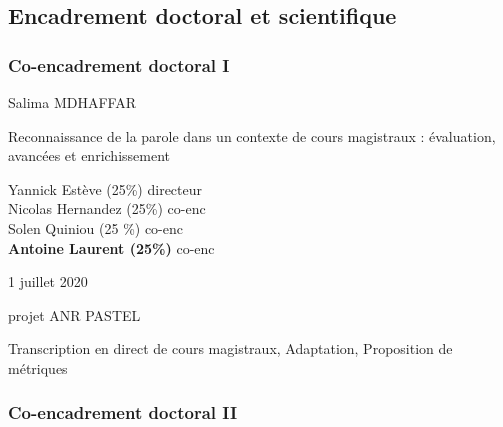 \documentclass[11pt,a4paper]{article}
\begin{document}
\subsection{Encadrement doctoral et scientifique}
        
\subsubsection{Co-encadrement doctoral I}

\begin{description}[noitemsep, align=right, leftmargin=*, font=\normalfont]
 \item [Doctorant] Salima MDHAFFAR
 \item [Intitulé] Reconnaissance de la parole dans un contexte de cours magistraux : évaluation, avancées et enrichissement
 \item [Encadrants] Yannick Estève (25\%) directeur \\ 
    Nicolas Hernandez (25\%) co-enc \\
    Solen Quiniou (25 \%) co-enc \\
     {\bf Antoine Laurent (25\%)} co-enc
 \item [Date soutenance] 1 juillet 2020
 \item [Financement] projet ANR PASTEL
 \item [Thématique] Transcription en direct de cours magistraux, Adaptation, Proposition de métriques
\end{description}

\subsubsection{Co-encadrement doctoral II}
\end{document}
